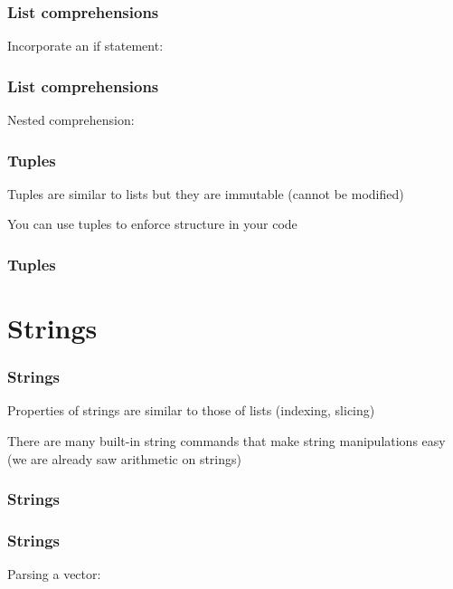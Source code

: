 \documentclass{beamer}
\begin{document}
\begin{frame}
\frametitle{List comprehensions}

Incorporate an if statement:


\end{frame}

\begin{frame}
\frametitle{List comprehensions}

Nested comprehension:


\end{frame}


\begin{frame}
\frametitle{Tuples}

Tuples are similar to lists but they are immutable (cannot be modified)

\vspace{0.1in}

You can use tuples to enforce structure in your code
\end{frame}

\begin{frame}
\frametitle{Tuples}


\end{frame}

\section{Strings}

\begin{frame}
\frametitle{Strings}
Properties of strings are similar to those of lists (indexing, slicing)

\vspace{0.1in}

There are many built-in string commands that make string manipulations easy (we are already saw arithmetic on strings)

\end{frame}


\begin{frame}
\frametitle{Strings}


\end{frame}

\begin{frame}
\frametitle{Strings}
Parsing a vector:

\end{frame}
\end{document}
